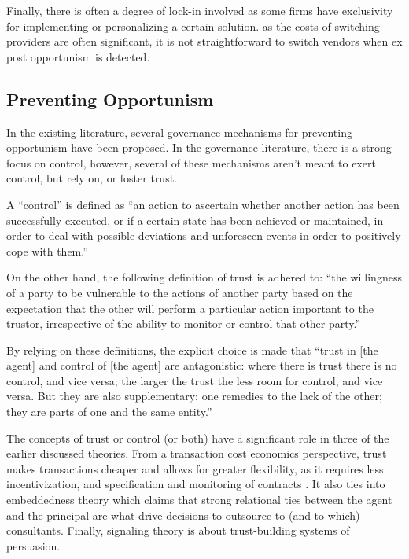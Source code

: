 \documentclass[12pt]{article}
\begin{document}
Finally, there is often a degree of lock-in involved as some firms have
exclusivity for implementing or personalizing a certain solution. as the
costs of switching providers are often significant, it is not
straightforward to switch vendors when ex post opportunism is detected.

\subsection{Preventing Opportunism}\label{preventing-opportunism}

In the existing literature, several governance mechanisms for preventing
opportunism have been proposed. In the governance literature, there is a
strong focus on control, however, several of these mechanisms aren't
meant to exert control, but rely on, or foster trust.

A ``control'' is defined as ``an action to ascertain whether another
action has been successfully executed, or if a certain state has been
achieved or maintained, in order to deal with possible deviations and
unforeseen events in order to positively cope with them.'' \citep[
809]{castelfranchi2000}

On the other hand, the following definition of trust is adhered to:
``the willingness of a party to be vulnerable to the actions of another
party based on the expectation that the other will perform a particular
action important to the trustor, irrespective of the ability to monitor
or control that other party.'' \citep{kee1970}

By relying on these definitions, the explicit choice is made that
``trust in {[}the agent{]} and control of {[}the agent{]} are
antagonistic: where there is trust there is no control, and vice versa;
the larger the trust the less room for control, and vice versa. But they
are also supplementary: one remedies to the lack of the other; they are
parts of one and the same entity.'' \citep[ 813]{castelfranchi2000}

The concepts of trust or control (or both) have a significant role in
three of the earlier discussed theories. From a transaction cost
economics perspective, trust makes transactions cheaper and allows for
greater flexibility, as it requires less incentivization, and
specification and monitoring of contracts \citep[ 989]{nooteboom1996}.
It also ties into embeddedness theory which claims that strong
relational ties between the agent and the principal are what drive
decisions to outsource to (and to which) consultants. Finally, signaling
theory is about trust-building systems of persuasion.
\end{document}
